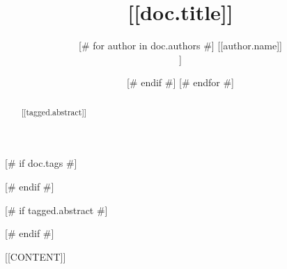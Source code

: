 \documentclass{article}
\title{[[doc.title]]}
\date{\displaydate{articleDate}}
\author{[# for author in doc.authors #]
[[author.name]]\\
[[author.affiliation]]\\
[# if not loop.last #]
\and
[# endif #]
[# endfor #]
}
\begin{document}
\maketitle

[# if doc.tags #]

[# endif #]

[# if tagged.abstract #]
\begin{abstract}
  [[tagged.abstract]]
\end{abstract}

[# endif #]


[[CONTENT]]



\end{document}
